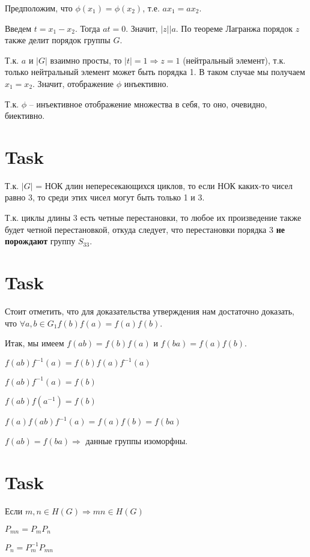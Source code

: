 \documentclass[12pt, a4paper]{article}
\theoremstyle{definition}
\begin{document}
    Предположим, что $\phi (x_1) = \phi (x_2)$, т.е. $ax_1 = ax_2$.

    Введем $t = x_1 - x_2$. Тогда $at = 0$. Значит, $|z| | a$. По теореме Лагранжа порядок $z$ также делит порядок группы $G$.

    Т.к. $a$ и $|G|$ взаимно просты, то $|t| = 1 \Rightarrow z = 1$ (нейтральный элемент), т.к. только нейтральный элемент может быть порядка 1.
    В таком случае мы получаем $x_1 = x_2$. Значит, отображение $\phi$ инъективно.
    
    Т.к. $\phi$ -- инъективное отображение множества в себя, то оно, очевидно, биективно.


\section{Task}

    Т.к. $|G|$ = НОК длин непересекающихся циклов, то если НОК каких-то чисел равно 3, то среди этих чисел могут быть только 1 и 3.
    
    Т.к. циклы длины 3 есть четные перестановки, то любое их произведение также будет четной перестановкой, откуда следует, что перестановки порядка 3 \textbf{не порождают} группу $S_{33}$.

\section{Task}

    Стоит отметить, что для доказательства утверждения нам достаточно доказать, что $\forall a, b \in G_1 f(b)f(a) = f(a)f(b)$.

    Итак, мы имеем $f(ab) = f(b)f(a)$ и $f(ba) = f(a)f(b)$.

    $f(ab)f^{-1}(a) = f(b)f(a)f^{-1}(a)$

    $f(ab)f^{-1}(a) = f(b)$

    $f(ab)f(a^{-1}) = f(b)$

    $f(a)f(ab)f^{-1}(a) = f(a)f(b) = f(ba)$

    $f(ab) = f(ba) \Rightarrow$ данные группы изоморфны. 

\section{Task}

    Если $m, n \in H(G) \Rightarrow mn \in H(G)$
    
    $P_{mn} = P_m P_n$

    $P_n = P^{-1}_m P_{mn}$
\end{document}
